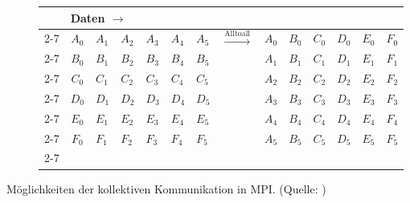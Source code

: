 \begin{figure}[tbp]
      \begin{subfigure}[l]{0.87\textwidth}
	\begin{tabular}[]{m{0.2cm} m{0.3cm}|m{0.3cm}|m{0.3cm}|m{0.3cm}|m{0.3cm}|m{0.3cm} m{1.5cm} m{0.3cm}|m{0.3cm}|m{0.3cm}|m{0.3cm}|m{0.3cm}|m{0.3cm}}
	  & \multicolumn{13}{l}{Daten $\longrightarrow$}\\
	  \cline{2-7} \cline{9-14}
	  \multirow{6}{*}{\begin{turn}{-90} Prozesse $\longrightarrow$ \end{turn}}
	  &\multicolumn{1}{|c|}{$A_0$}&$A_1$&$A_2$&$A_3$&$A_4$&\multicolumn{1}{|m{0.3cm}|}{$A_5$} &\multirow{6}{*}{\large $\xrightarrow{\text{Alltoall}}$} & \multicolumn{1}{|c|}{$A_0$}&$B_0$&$C_0$&$D_0$&$E_0$&\multicolumn{1}{|m{0.3cm}|}{$F_0$}\\
	  \cline{2-7} \cline{9-14}
	  &\multicolumn{1}{|c|}{$B_0$}&$B_1$&$B_2$&$B_3$&$B_4$&\multicolumn{1}{|m{0.3cm}|}{$B_5$} & & \multicolumn{1}{|c|}{$A_1$}&$B_1$&$C_1$&$D_1$&$E_1$&\multicolumn{1}{|m{0.3cm}|}{$F_1$}\\
	  \cline{2-7} \cline{9-14}
	  &\multicolumn{1}{|c|}{$C_0$}&$C_1$&$C_2$&$C_3$&$C_4$&\multicolumn{1}{|m{0.3cm}|}{$C_5$} & & \multicolumn{1}{|c|}{$A_2$}&$B_2$&$C_2$&$D_2$&$E_2$&\multicolumn{1}{|m{0.3cm}|}{$F_2$}\\
	  \cline{2-7} \cline{9-14}
	  &\multicolumn{1}{|c|}{$D_0$}&$D_1$&$D_2$&$D_3$&$D_4$&\multicolumn{1}{|m{0.3cm}|}{$D_5$} & & \multicolumn{1}{|c|}{$A_3$}&$B_3$&$C_3$&$D_3$&$E_3$&\multicolumn{1}{|m{0.3cm}|}{$F_3$}\\
	  \cline{2-7} \cline{9-14}
	  &\multicolumn{1}{|c|}{$E_0$}&$E_1$&$E_2$&$E_3$&$E_4$&\multicolumn{1}{|m{0.3cm}|}{$E_5$} & & \multicolumn{1}{|c|}{$A_4$}&$B_4$&$C_4$&$D_4$&$E_4$&\multicolumn{1}{|m{0.3cm}|}{$F_4$}\\
	  \cline{2-7} \cline{9-14}
	  &\multicolumn{1}{|c|}{$F_0$}&$F_1$&$F_2$&$F_3$&$F_4$&\multicolumn{1}{|m{0.3cm}|}{$F_5$} & & \multicolumn{1}{|c|}{$A_5$}&$B_5$&$C_5$&$D_5$&$E_5$&\multicolumn{1}{|m{0.3cm}|}{$F_5$}\\
	  \cline{2-7} \cline{9-14}
	\end{tabular}
      \end{subfigure}
      
      \caption{Möglichkeiten der kollektiven Kommunikation in MPI. (Quelle: \citet{dartmouth})}%
      \label{fig:kolkom}%
\end{figure}%